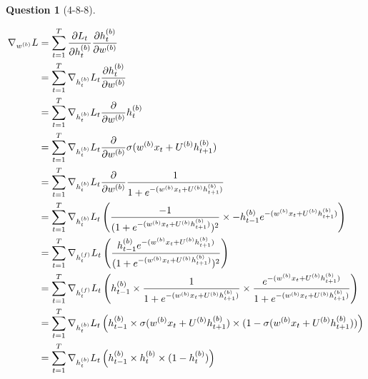 \documentclass[12pt]{article}
\theoremstyle{definition}
\newtheorem{exercise}{Question}%
\newcommand{\pd}[2]{\frac{\partial#1}{\partial#2}}
\begin{document}
\begin{exercise}[4-8-8]
{\begin{enumerate}
{    \begin{alignat*}{3}
    \nabla_{\expr{w}{}{b}}L &= \sum_{t=1}^T \pd{L_t}{\expr{h}{t}{b}}\pd{\expr{h}{t}{b}}{\expr{w}{}{b}}
    \\
    &= \sum_{t=1}^T \nabla_{h_t^{(b)}}L_t \pd{\expr{h}{t}{b}}{\expr{w}{}{b}}
    \\
    &= \sum_{t=1}^T \nabla_{h_t^{(b)}}L_t\pd{}{\expr{w}{}{b}}\expr{h}{t}{b}
    \\
    &= \sum_{t=1}^T \nabla_{h_t^{(b)}}L_t\pd{}{\expr{w}{}{b}}\sigma(\linearb) 
    \\
    &= \sum_{t=1}^T \nabla_{h_t^{(b)}}L_t\pd{}{\expr{w}{}{b}}\frac{1}{1+e^{-(\linearb)}}
    \\
    &= \sum_{t=1}^T \nabla_{h_t^{(b)}}L_t \left ( \frac{-1}{(1+e^{-(\linearb)})^2} \times -\expr{h}{t-1}{b} e^{-(\linearb)} \right )
    \\
    &= \sum_{t=1}^T \nabla_{h_t^{(f)}}L_t \left ( \frac{\expr{h}{t-1}{b} e^{-(\linearb)}}{(1+e^{-(\linearb)})^2} \right )
    \\
    &= \sum_{t=1}^T \nabla_{h_t^{(f)}}L_t \left ( \expr{h}{t-1}{b} \times \frac{1}{1+e^{-(\linearb)}} \times \frac{e^{-(\linearb)}}{1+e^{-(\linearb)}} \right )
    \\
    &= \sum_{t=1}^T \nabla_{h_t^{(b)}}L_t \left ( \expr{h}{t-1}{b} \times \sigma(\linearb) \times (1-\sigma(\linearb)) \right )
    \\
    &= \sum_{t=1}^T \nabla_{h_t^{(b)}}L_t \left ( \expr{h}{t-1}{b} \times \expr{h}{t}{b} \times (1-\expr{h}{t}{b}) \right )
    \end{alignat*}
    }
\end{enumerate}
}

\end{exercise}
\end{document}
